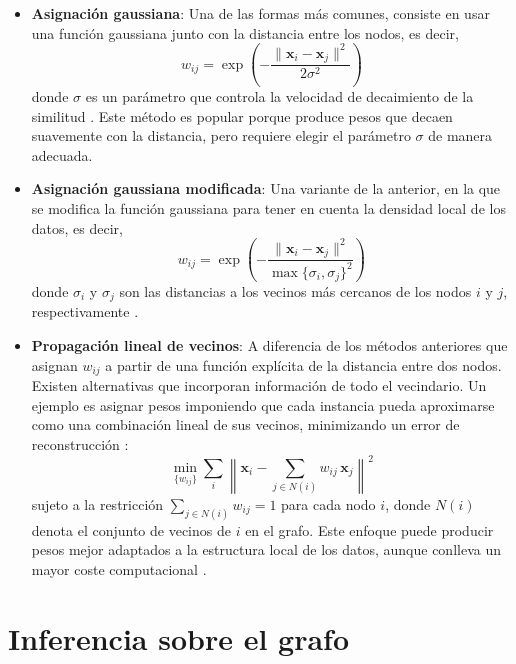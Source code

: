 \begin{itemize}
    \item \textbf{Asignación gaussiana}: Una de las formas más comunes, consiste en usar una función gaussiana junto con la distancia entre los nodos, es decir, 
    \begin{equation}
        w_{ij} = \exp(-\frac{\|\mathbf{x}_i - \mathbf{x}_j\|^2}{2\sigma^2})
    \end{equation}
    donde $\sigma$ es un parámetro que controla la velocidad de decaimiento de la similitud \cite{zhu2009introduction}. Este método es popular porque produce pesos que decaen suavemente con la distancia, pero requiere elegir el parámetro $\sigma$ de manera adecuada.

    \item \textbf{Asignación gaussiana modificada}: Una variante de la anterior, en la que se modifica la función gaussiana para tener en cuenta la densidad local de los datos, es decir,
    \begin{equation}
        w_{ij} = \exp(-\frac{\|\mathbf{x}_i - \mathbf{x}_j\|^2}{\max\{\sigma_i, \sigma_j\}^2})
    \end{equation}
    donde $\sigma_i$ y $\sigma_j$ son las distancias a los vecinos más cercanos de los nodos $i$ y $j$, respectivamente \cite{hein2006manifold}. 

    \item \textbf{Propagación lineal de vecinos}: A diferencia de los métodos anteriores que asignan $w_{ij}$ a partir de una función explícita de la distancia entre dos nodos. Existen alternativas que incorporan información de todo el vecindario. Un ejemplo es asignar pesos imponiendo que cada instancia pueda aproximarse como una combinación lineal de sus vecinos, minimizando un error de reconstrucción \cite{van2020survey}:
    \begin{equation}
        \min_{\{w_{ij}\}} \sum_{i} \left\| \mathbf{x}_i - \sum_{j \in N(i)} w_{ij} \, \mathbf{x}_j \right\|^2
    \end{equation}
    sujeto a la restricción $\sum_{j \in N(i)} w_{ij} = 1$ para cada nodo $i$, donde $N(i)$ denota el conjunto de vecinos de $i$ en el grafo. Este enfoque puede producir pesos mejor adaptados a la estructura local de los datos, aunque conlleva un mayor coste computacional \cite{van2020survey}.
\end{itemize}


\section{Inferencia sobre el grafo}

